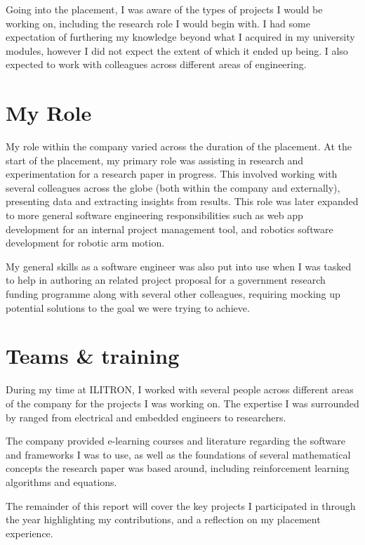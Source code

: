 Going into the placement, I was aware of the types of projects I would be working on, including the
research role I would begin with. I had some expectation of furthering my  knowledge beyond
what I acquired in my university modules, however I did not expect the extent of which it ended up
being. I also expected to work with colleagues across different areas of engineering.

\section{My Role}

My role within the company varied across the duration of the placement. At the start of the
placement, my primary role was assisting in research and experimentation for a research paper in
progress. This involved working with several colleagues across the globe (both within the company
and externally), presenting data and extracting insights from results. This role was later expanded
to more general software engineering responsibilities such as web app development for an internal
project management tool, and robotics software development for robotic arm motion.

My general skills as a software engineer was also put into use when I was tasked to help in
authoring an  related project proposal for a government research funding programme along
with several other colleagues, requiring mocking up potential solutions to the goal we were trying
to achieve.

\section{Teams \& training}

During my time at ILITRON, I worked with several people across different areas of the company for
the projects I was working on. The expertise I was surrounded by ranged from electrical and embedded
engineers to  researchers.

The company provided e-learning courses and literature regarding the software and 
frameworks I was to use, as well as the foundations of several mathematical concepts the research
paper was based around, including reinforcement learning algorithms and  equations.

The remainder of this report will cover the key projects I participated in through the year
highlighting my contributions, and a reflection on my placement experience.
